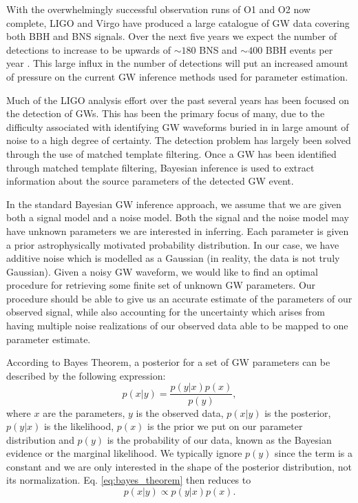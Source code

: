 \documentclass[%
showpacs,
 amsmath,amssymb,
 aps,
 twocolumn,
 prl,
 reprint,
floatfix,
]{revtex4-1}
\begin{document}
%
%
With the overwhelmingly successful observation runs of O1 and O2 
now complete, \ac{LIGO} and Virgo have produced a large 
catalogue of \ac{GW} data covering both \ac{BBH} and {BNS} signals\cite{1811.12907}. Over the next five years 
we expect the number of detections to increase to be upwards 
of $\sim180$ BNS and $\sim400$ BBH events per year \cite{1304.0670,1811.12907}. This large influx in the number 
of detections will put an increased amount of pressure on the current \ac{GW} inference 
methods used for parameter estimation.  

%
%
Much of the \ac{LIGO} analysis effort over the past several years has been focused 
on the detection of \ac{GW}s. This has been the primary 
focus of many, due to the difficulty associated 
with identifying \ac{GW} waveforms buried in 
in large amount of noise to a high degree of certainty. The detection problem has largely 
been solved through the use of matched template filtering\cite{0264-9381-33-21-215004}. 
Once a \ac{GW} has been identified through matched template filtering, Bayesian inference 
is used to extract information about the source 
parameters of the detected \ac{GW} event.

%
%
In the standard Bayesian \ac{GW} inference approach, we assume that we are
given both a signal model and a noise model. Both the signal and the 
noise model may have unknown parameters we are interested in inferring. 
Each parameter is given a prior astrophysically motivated probability 
distribution. In our case, we have additive noise which is modelled as 
a Gaussian (in reality, the data is not truly Gaussian). Given a noisy
\ac{GW} waveform, we would like to find an optimal procedure for retrieving
some finite set of unknown GW parameters. Our procedure should be able
to give us an accurate estimate of the parameters of our observed signal, while
also accounting for the uncertainty which arises from having multiple noise
realizations of our observed data able to be mapped to one parameter
estimate.

%
%
According to Bayes Theorem, a posterior for a set of GW parameters can be described by the
following expression:
%
\begin{equation}
    p(x|y) = \frac{p(y|x) p(x)}{p(y)},\label{eq:bayes_theorem}
\end{equation}
%
where $x$ are the parameters, $y$ is the
observed data, $p(x|y)$ is the posterior, $p(y|x)$ is the likelihood, $p(x)$ is
the prior we put on our parameter distribution and $p(y)$ is the probability of
our data, known as the Bayesian evidence or the marginal likelihood. We
typically ignore $p(y)$ since the term is a constant and we are only interested
in the shape of the posterior distribution, not its normalization. Eq.
\ref{eq:bayes_theorem} then reduces to
%
\begin{equation}\label{eq:simplified_bayes} 
p(x|y) \propto p(y|x) p(x).
\end{equation} 
   
\end{document}
